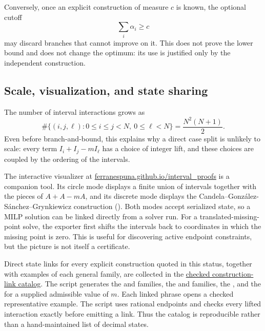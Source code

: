 Conversely, once an explicit construction of measure \(c\) is known, the
optional cutoff
\[
    \sum_i\alpha_i\geq c
\]
may discard branches that cannot improve on it.  This does not prove the
lower bound and does not change the optimum: its use is justified only by the
independent construction.

\subsection{Scale, visualization, and state sharing}

The number of interval interactions grows as
\[
    \#\{(i,j,\ell):0\leq i\leq j<N,\ 0\leq\ell<N\}
    =\frac{N^2(N+1)}2.
\]
Even before branch-and-bound, this explains why a direct case split is
unlikely to scale: every term \(I_i+I_j-mI_\ell\) has a choice of integer lift,
and these choices are coupled by the ordering of the intervals.

The interactive visualizer at
\href{https://ferranespuna.github.io/interval_proofs/}{ferranespuna.github.io/interval\_proofs}
is a companion tool.  Its circle mode displays a finite union of intervals
together with the pieces of \(A+A-mA\), and its discrete mode displays the
Candela--Gonz\'alez-S\'anchez--Grynkiewicz construction
().  Both modes accept
serialized state, so a MILP solution can be linked directly from a solver run.
For a translated-missing-point solve, the exporter first shifts the intervals
back to coordinates in which the missing point is zero.  This is useful for
discovering active endpoint constraints, but the picture is not itself a
certificate.

Direct state links for every explicit construction quoted in this status,
together with examples of each general family, are collected in the
\href{https://github.com/ferranEspuna/interval_proofs/blob/main/VISUALIZER_LINKS.md}{checked construction-link catalog}.
The script  generates the
 and
 families, the
 and
 families,
the , and the
 for a supplied admissible
value of \(m\).  Each linked phrase opens a checked representative example.
The script uses rational endpoints and checks every lifted interaction exactly
before emitting a link.  Thus the catalog is reproducible rather than a
hand-maintained list of decimal states.

